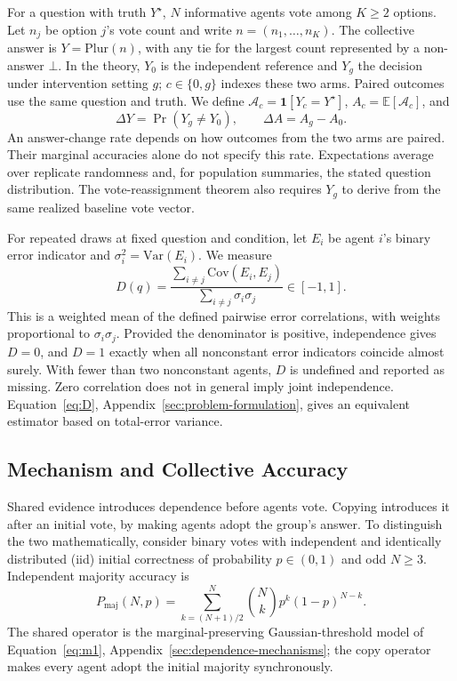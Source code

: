 \documentclass[11pt,a4paper]{article}
\theoremstyle{definition}
\newcommand{\Dep}{D}
\newcommand{\Plur}{\mathrm{Plur}}
\newcommand{\Truth}{Y^{\star}}
\begin{document}
For a question with truth $\Truth$, $N$ informative agents vote among
$K\ge2$ options. Let $n_j$ be option $j$'s vote count and write
$n=(n_1,\ldots,n_K)$. The collective answer is $Y=\Plur(n)$, with
any tie for the largest count represented by a non-answer $\bot$. In the theory, $Y_0$
is the independent reference and $Y_g$ the decision under intervention
setting $g$; $c\in\{0,g\}$ indexes these two arms. Paired outcomes use the
same question and truth. We define
$\mathcal A_c=\mathbf1[Y_c=\Truth]$, $A_c=\mathbb E[\mathcal A_c]$, and
\begin{equation}
\Delta Y=\Pr(Y_g\neq Y_0),\qquad \Delta A=A_g-A_0.
\label{eq:main-outcomes}
\end{equation}
An answer-change rate depends on how outcomes from the two arms are paired.
Their marginal accuracies alone do not specify this rate. Expectations average over
replicate randomness and, for population summaries, the stated question
distribution. The vote-reassignment theorem also requires
$Y_g$ to derive from the same realized baseline vote vector.

For repeated draws at fixed question and condition, let $E_i$ be agent $i$'s
binary error indicator and $\sigma_i^2=\mathrm{Var}(E_i)$. We measure
\begin{equation}
\Dep(q)=\frac{\sum_{i\neq j}\mathrm{Cov}(E_i,E_j)}
{\sum_{i\neq j}\sigma_i\sigma_j}\in[-1,1].
\label{eq:main-dep}
\end{equation}
This is a weighted mean of the defined pairwise error correlations, with
weights proportional to $\sigma_i\sigma_j$. Provided
the denominator is positive, independence gives $\Dep=0$, and $\Dep=1$
exactly when all nonconstant error indicators coincide almost surely.
With fewer than two nonconstant agents, $\Dep$ is undefined and reported
as missing. Zero correlation does not in general imply joint independence.
Equation~\ref{eq:D}, Appendix~\ref{sec:problem-formulation}, gives an
equivalent estimator based on total-error variance.

\subsection{Mechanism and Collective Accuracy}
\label{sec:main-mechanism}

Shared evidence introduces dependence before agents vote. Copying introduces
it after an initial vote, by making agents adopt the group's answer. To distinguish the two mathematically,
consider binary votes with independent and identically distributed (iid) initial correctness of probability
$p\in(0,1)$ and odd $N\ge3$. Independent majority accuracy is
\begin{equation}
P_{\mathrm{maj}}(N,p)=\sum_{k=(N+1)/2}^{N}\binom Nk p^k(1-p)^{N-k}.
\label{eq:main-majority}
\end{equation}
The shared operator is the marginal-preserving Gaussian-threshold model
of Equation~\ref{eq:m1}, Appendix~\ref{sec:dependence-mechanisms}; the copy
operator makes every agent adopt the initial majority synchronously.
\end{document}
